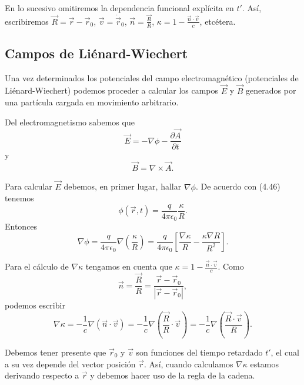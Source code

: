 \documentclass[12pt,a4paper]{book}
\begin{document}
En lo sucesivo omitiremos la dependencia funcional explícita en $t'$. Así, escribiremos $\vec{R} = \vec{r} - \vec{r}_0$, $\vec{v} = \dot{\vec{r}}_0$, $\vec{n} = \frac{\vec{R}}{R}$, $\kappa = 1 - \frac{\vec{n} \cdot \vec{v}}{c}$, etcétera.

\subsection{Campos de Liénard-Wiechert}

Una vez determinados los potenciales del campo electromagnético (potenciales de Liénard-Wiechert) podemos proceder a calcular los campos $\vec{E}$ y $\vec{B}$ generados por una partícula cargada en movimiento arbitrario.

Del electromagnetismo sabemos que
\begin{equation}
\vec{E} = -\nabla\phi - \frac{\partial\vec{A}}{\partial t}
\end{equation}
y
\begin{equation}
\vec{B} = \nabla \times \vec{A}.
\end{equation}

Para calcular $\vec{E}$ debemos, en primer lugar, hallar $\nabla\phi$. De acuerdo con (4.46) tenemos
\begin{equation}
\phi(\vec{r}, t) = \frac{q}{4\pi\epsilon_0}\frac{\kappa}{R}.
\end{equation}
Entonces
\begin{equation}
\nabla\phi = \frac{q}{4\pi\epsilon_0}\nabla\left(\frac{\kappa}{R}\right) = \frac{q}{4\pi\epsilon_0}\left[\frac{\nabla\kappa}{R} - \frac{\kappa\nabla R}{R^2}\right].
\end{equation}

Para el cálculo de $\nabla\kappa$ tengamos en cuenta que $\kappa = 1 - \frac{\vec{n} \cdot \vec{v}}{c}$. Como
\begin{equation}
\vec{n} = \frac{\vec{R}}{R} = \frac{\vec{r} - \vec{r}_0}{|\vec{r} - \vec{r}_0|},
\end{equation}
podemos escribir
\begin{equation}
\nabla\kappa = -\frac{1}{c}\nabla(\vec{n} \cdot \vec{v}) = -\frac{1}{c}\nabla\left(\frac{\vec{R}}{R} \cdot \vec{v}\right) = -\frac{1}{c}\nabla\left(\frac{\vec{R} \cdot \vec{v}}{R}\right).
\end{equation}

Debemos tener presente que $\vec{r}_0$ y $\vec{v}$ son funciones del tiempo retardado $t'$, el cual a su vez depende del vector posición $\vec{r}$. Así, cuando calculamos $\nabla\kappa$ estamos derivando respecto a $\vec{r}$ y debemos hacer uso de la regla de la cadena.
\end{document}
